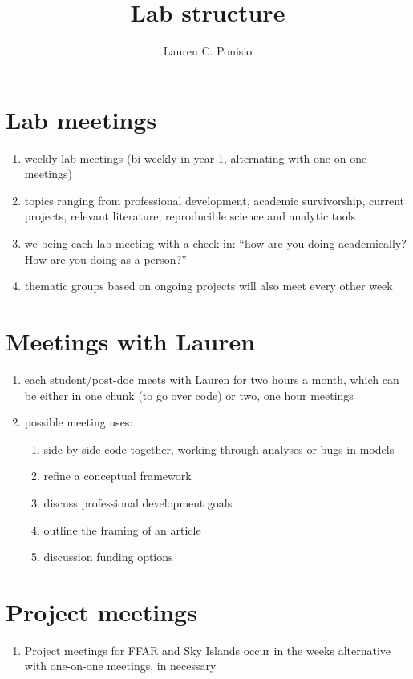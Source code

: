 \documentclass[12pt]{article}
\title{Lab structure}
\author{Lauren C. Ponisio}
\begin{document}
\maketitle

\section{Lab meetings}
\begin{enumerate}
\item weekly lab meetings (bi-weekly in year 1, alternating with
  one-on-one meetings)
\item topics ranging from professional development, academic
  survivorship, current projects, relevant literature, reproducible
  science and analytic tools
\item we being each lab meeting with a check in: ``how are you doing
  academically? How are you doing as a person?''
\item thematic groups based on ongoing projects will also meet every
  other week
\end{enumerate}

\section{Meetings with Lauren}
\begin{enumerate}
\item each student/post-doc meets with Lauren for two hours a month,
  which can be either in one chunk (to go over code) or two, one hour
  meetings
\item possible meeting uses:
  \begin{enumerate}
  \item side-by-side code together, working through analyses or bugs
    in models
  \item refine a conceptual framework
  \item discuss professional development goals
  \item outline the framing of an article
  \item discussion funding options
  \end{enumerate}
\end{enumerate}

\section{Project meetings}
\begin{enumerate}
\item Project meetings for FFAR and Sky Islands occur in the weeks
  alternative with one-on-one meetings, in necessary
\end{enumerate}
\end{document}
